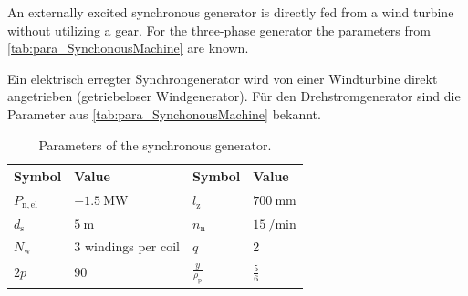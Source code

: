 




An externally excited synchronous generator is directly fed from a wind turbine without utilizing a gear.
For the three-phase generator the parameters from \autoref{tab:para_SynchonousMachine} are known.

\vspace{1em}
\color{gray}
Ein elektrisch erregter Synchrongenerator wird von einer Windturbine direkt angetrieben (getriebeloser Windgenerator). Für den Drehstromgenerator sind die Parameter aus \autoref{tab:para_SynchonousMachine} bekannt.
\color{black}

\begin{table}[htb]
    \caption{Parameters of the synchronous generator.}
    \centering
    \begin{tabular}{llll}\toprule
    Symbol       & Value    & Symbol    & Value \\
    \midrule
    $P_{\mathrm{n,el}}$    & $\SI{-1.5}{\mega\watt}$ & $l_{\mathrm{z}}$   & $\SI{700}{\milli\metre}$ \\
    $d_{\mathrm{s}}$       & $\SI{5}{\metre}$       & $n_{\mathrm{n}}$    & $\SI{15}{\per\minute}$ \\
    $N_{\mathrm{w}}$       & 3 windings per coil    & $q$    & 2 \\
    $2p$                   & 90                     & $\frac{y}{\rho_{\mathrm{p}}}$    & $\frac{5}{6}$ \\
    \bottomrule
    \end{tabular}
    \label{tab:para_SynchonousMachine}
\end{table}
\vspace{-1.3em}

